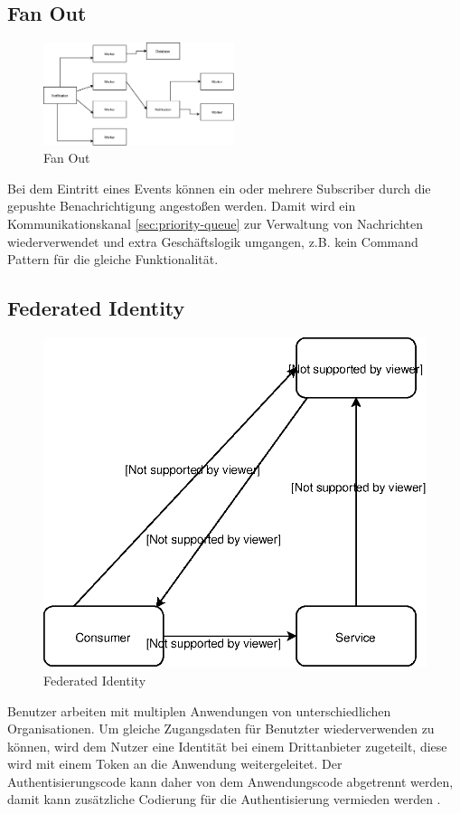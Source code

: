 \documentclass[
12pt,
english,
ngerman,
headsepline,
twoside,
openright,
numbers=noenddot,version=first
]{scrreprt}
\begin{document}
\subsection{Fan Out}
\label{sec:fan-out}
\begin{figure}
	\includegraphics[height=3cm]{./pics/pattern-fan-out.eps}
	\caption{Fan Out}
	\label{pic:fan-out}
\end{figure}
Bei dem Eintritt eines Events können ein oder mehrere Subscriber durch die gepushte Benachrichtigung angestoßen werden. Damit wird ein Kommunikationskanal \ref{sec:priority-queue} zur Verwaltung von Nachrichten wiederverwendet und extra Geschäftslogik umgangen, z.B. kein Command Pattern für die gleiche Funktionalität\cite{serverlessArchAWS}.

\subsection{Federated Identity}\label{sec:federated-identity}
\begin{figure}
	\includegraphics[scale=0.36]{./pics/pattern-federated-identity.eps}
	\caption{Federated Identity}
	\label{pic:federated-identity}
\end{figure}
Benutzer arbeiten mit multiplen Anwendungen von unterschiedlichen Organisationen. Um gleiche Zugangsdaten für Benutzter wiederverwenden zu können, wird dem Nutzer eine Identität bei einem Drittanbieter zugeteilt, diese wird mit einem Token an die Anwendung weitergeleitet. Der Authentisierungscode kann daher von dem Anwendungscode abgetrennt werden, damit kann zusätzliche Codierung für die Authentisierung vermieden werden .
\end{document}
